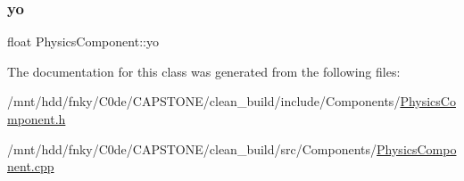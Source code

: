 \subsubsection{\texorpdfstring{yo}{yo}}
{\footnotesize\ttfamily float Physics\+Component\+::yo\hspace{0.3cm}{\ttfamily [private]}}



The documentation for this class was generated from the following files\+:\begin{DoxyCompactItemize}
\item 
/mnt/hdd/fnky/\+C0de/\+C\+A\+P\+S\+T\+O\+N\+E/clean\+\_\+build/include/\+Components/\hyperlink{PhysicsComponent_8h}{Physics\+Component.\+h}\item 
/mnt/hdd/fnky/\+C0de/\+C\+A\+P\+S\+T\+O\+N\+E/clean\+\_\+build/src/\+Components/\hyperlink{PhysicsComponent_8cpp}{Physics\+Component.\+cpp}\end{DoxyCompactItemize}
